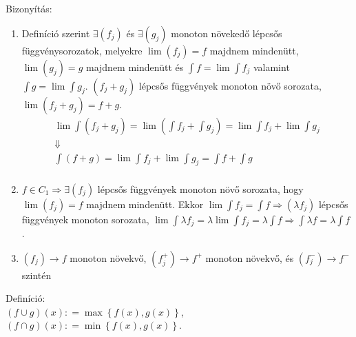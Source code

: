 \documentclass[12pt,a4paper]{scrartcl}
\providecommand{\tightlist}{%
  \setlength{\itemsep}{0pt}\setlength{\parskip}{0pt}}
\newenvironment{definicio}{}{}
\newenvironment{bizonyitas}{}{}
\begin{document}
\begin{bizonyitas}

Bizonyítás:

\begin{enumerate}
\def\labelenumi{\arabic{enumi}.}
\tightlist
\item
  Definíció szerint \(\exists\left( f_{j} \right)\) és
  \(\exists\left( g_{j} \right)\) monoton növekedő lépcsős
  függvénysorozatok, melyekre \(\lim\left( f_{j} \right) = f\) majdnem
  mindenütt, \(\lim\left( g_{j} \right) = g\) majdnem mindenütt és
  \({\int f} = \lim{\int f_{j}}\) valamint
  \({\int g} = \lim{\int g_{j}}\). \(\left( {f_{j} + g_{j}} \right)\)
  lépcsős függvények monoton növő sorozata,
  \(\lim\left( {f_{j} + g_{j}} \right) = f + g\). \[\begin{gathered}
    \lim \int {\left( {{f_j} + {g_j}} \right)}  = \lim \left( {\int {{f_j}}  + \int {{g_j}} } \right) = \lim \int {{f_j}}  + \lim \int {{g_j}}  \\ 
     \Downarrow  \\ 
    \int {\left( {f + g} \right)}  = \lim \int {{f_j}}  + \lim \int {{g_j}}  = \int f  + \int g  \\ 
  \end{gathered} \]
\item
  \(\left. f \in C_{1}\Rightarrow\exists\left( f_{j} \right) \right.\)
  lépcsős függvények monoton növő sorozata, hogy
  \(\lim\left( f_{j} \right) = f\) majdnem mindenütt. Ekkor
  \(\left. \lim{\int f_{j}} = {\int f}\Rightarrow\left( {\lambda f_{j}} \right) \right.\)
  lépcsős függvények monoton sorozata,
  \(\left. \lim{\int{\lambda f_{j}}} = \lambda\lim{\int f_{j}} = \lambda{\int f}\Rightarrow{\int{\lambda f}} = \lambda{\int f} \right.\).
\item
  \(\left. \left( f_{j} \right)\rightarrow f \right.\) monoton növekvő,
  \(\left. \left( f_{j}^{+} \right)\rightarrow f^{+} \right.\) monoton
  növekvő, és
  \(\left. \left( f_{j}^{-} \right)\rightarrow f^{-} \right.\) szintén
\end{enumerate}

\end{bizonyitas}

\begin{definicio}

Definíció:\\
\(\left( {f \cup g} \right)\left( x \right): = \max\left\{ {f\left( x \right),g\left( x \right)} \right\}\),
\(\left( {f \cap g} \right)\left( x \right): = \min\left\{ {f\left( x \right),g\left( x \right)} \right\}\).

\end{definicio}
\end{document}
